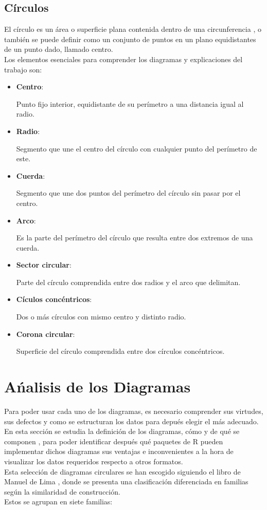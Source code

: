 \documentclass{article}\usepackage[]{graphicx}\usepackage[]{color}
\begin{document}
\subsection{C\'irculos}
El c\'irculo es un \'area o superficie plana contenida dentro de una circunferencia\cite{rae}
, o tambi\'en se puede definir como un conjunto de puntos en un plano equidistantes de un punto dado, llamado centro\cite{circulo}.~\\
Los elementos esenciales para comprender los diagramas y explicaciones del trabajo son:
\begin{itemize}
\item \textbf{Centro}:~\par Punto fijo interior, equidistante de su per\'imetro a una distancia igual al radio.
\item \textbf{Radio}:~\par Segmento que une el centro del c\'irculo con cualquier punto del per\'imetro de este.
\item \textbf{Cuerda}:~\par Segmento que une dos puntos del per\'imetro del c\'irculo sin pasar por el centro.
\item \textbf{Arco}:~\par Es la parte del per\'imetro del c\'irculo que resulta entre dos extremos de una cuerda.
\item \textbf{Sector circular}:~\par Parte del c\'irculo comprendida entre dos radios y el arco que delimitan.
\item \textbf{C\'iculos conc\'entricos}:~\par Dos o m\'as c\'irculos con mismo centro y distinto radio.
\item \textbf{Corona circular}:~\par Superficie del c\'irculo comprendida entre dos c\'irculos conc\'entricos.
\end{itemize}
\clearpage
\section{A\'nalisis de los Diagramas}\label{sec:Analisis}
Para poder usar cada uno de los diagramas, es necesario comprender sus virtudes, sus defectos y como se estructuran los datos para depu\'es elegir el m\'as adecuado.~\\
En esta secci\'on se estudia la definici\'on de los diagramas, c\'omo y de qu\'e se componen , para poder identificar despu\'es qu\'e paquetes de R pueden implementar dichos diagramas sus ventajas e inconvenientes a la hora de visualizar los datos requeridos respecto a otros formatos.~\\
Esta selecci\'on de diagramas circulares se han escogido siguiendo el libro de Manuel de Lima\cite{Circle}
, donde se presenta una clasificaci\'on diferenciada en familias seg\'un la similaridad de construcci\'on.~\\ Estos se agrupan en siete familias:
\end{document}
